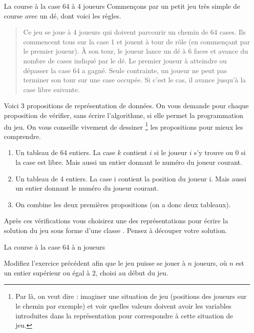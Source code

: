 \begin{Exercice}{La course à la case 64 à 4 joueurs}
	Commençons par un petit jeu très simple de course avec un dé, dont voici les règles.
	
	\begin{quote}
	\og Ce jeu se joue à 4 joueurs qui doivent parcourir un chemin de 64 cases.
	Ils commencent tous sur la case 1 et jouent à tour de rôle
	(en commençant par le premier joueur).
	À son tour, le joueur lance un dé à 6 faces 
	et avance du nombre de cases indiqué par le dé.
	Le premier joueur à atteindre ou dépasser la case 64 a gagné.
	Seule contrainte, un joueur ne peut pas terminer son tour
	sur une case occupée. 
	Si c'est le cas, il avance jusqu'à la case libre suivante.\fg
	\end{quote}
	
	Voici 3 propositions de représentation de données. 
	On vous demande pour chaque proposition de vérifier, 
	sans écrire l'algorithme, si elle permet la programmation du jeu. 
	On vous conseille vivement de \og{}dessiner\fg{}%
	\footnote{
		Par là, on veut dire : imaginer une situation de jeu
		(positions des joueurs sur le chemin par exemple)
		et voir quelles valeurs doivent avoir les variables
		introduites dans la représentation pour correspondre
		à cette situation de jeu. 
	} les propositions
	pour mieux les comprendre.
	
	\begin{enumerate}
	\item 
		Un tableau de 64 entiers.
		La case $k$ contient $i$ si le joueur $i$ s'y trouve 
		ou $0$ si la case est libre.
		Mais aussi un entier  donnant
		le numéro du joueur courant.
	\item
		Un tableau de 4 entiers. 
		La case i contient la position du joueur i.
		Mais aussi un entier  donnant
		le numéro du joueur courant.
	\item
		On combine les deux premières propositions
		(on a donc deux tableaux).
	\end{enumerate}

	Après ces vérifications vous choisirez une des représentations 
	pour écrire la solution du jeu sous forme d'une classe .
	Pensez à découper votre solution.
	
\end{Exercice}

\begin{Exercice}{La course à la case 64 à n joueurs}

	Modifiez l'exercice précédent 
	afin que le jeu puisse se jouer à $n$ joueurs,
	où $n$ est un entier supérieur ou égal à 2, choisi au début du jeu.

\end{Exercice}
	
